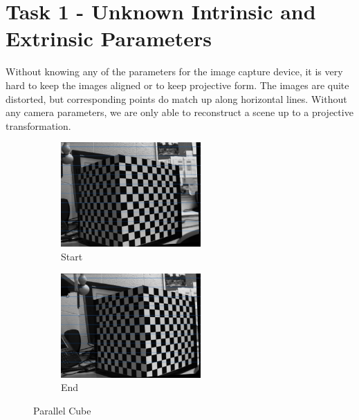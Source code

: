 \documentclass[10pt,a4paper]{article}
\begin{document}
\section*{Task 1 - Unknown Intrinsic and Extrinsic Parameters}

Without knowing any of the parameters for the image capture device, it is very hard to keep the images aligned or to keep projective form. The images are quite distorted, but corresponding points do match up along horizontal lines. Without any camera parameters, we are only able to reconstruct a scene up to a projective transformation.

\begin{figure}[h]
\centering
\begin{subfigure}{.5\textwidth}
  \centering
  \includegraphics[height=4cm,keepaspectratio]{paraCubeS}
  \caption{Start}
  \label{fig:sub1}
\end{subfigure}%
\begin{subfigure}{.5\textwidth}
  \centering
  \includegraphics[height=4cm,keepaspectratio]{paraCubeE}
  \caption{End}
  \label{fig:sub2}
\end{subfigure}
\label{fig:test}
\caption{Parallel Cube}
\end{figure}
\end{document}
